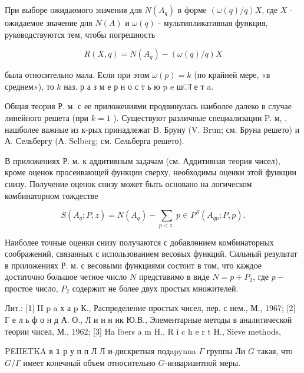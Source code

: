 \documentclass[10pt]{article}
\begin{document}
При выборе ожидаөмого значения для $N\left(A_{q}\right)$ в форме $(\omega(q) / q) X$, где $X$ - ожидаемое значение для $N(A)$ и $\omega(q)$ - мультипликативная функция, руководствуются тем, чтобы погрешность



\[

R(X, q)=N\left(A_{q}\right)-(\omega(q) / q) X

\]



была относительно мала. Если при этом $\omega(p)=k$ (по крайней мере, «в среднем»), то $k$ наз. р а з м е р н о с т ь ю p e шा е т a.



Общая теория Р. м. с ее приложениями продвинулась наиболее далеко в случае линейного решета (при $k=1$ ). Существуют различные специализации P. м, , нашболее важные из к-рых принадлежат B. Бруну (V. Brun; см. Бруна решето) и А. Сельбергу (А. Selberg; см. Сельберга решето).



В приложениях Р. м. к аддитивным задачам (см. Аддитивная теория чисел), кроме оценок просеивающей функции сверху, необходимы оценки этой функции снизу. Получение оценок снизу может быть основано на логическом комбинаторном тождестве



\[

S\left(A_{q} ; P, z\right)=N\left(A_{q}\right)-\sum_{p<z,} p \in P^{S}\left(A_{q p} ; P, p\right) .

\]



Наиболее точные оценки снизу получаются с добавлөнием комбинаторных соображений, связанных с использованием весовых функций. Сильный результат в приложениях Р. м. с весовыми функциями состоит в том, что каждое достаточно большое четное число $N$ представимо в виде $N=p+P_{2}$, где $p-$ простое число, $P_{2}$ содержит не более двух простых множителей.



Лит.: [1] II p a х а p К., Распределение простых чисел, пер. с нем., М., 1967; [2] Г е л ь ф о н д А. О., Л и н н ик Ю.В., Элементарные методы в аналитической теории чисел, М., 1962; [3] Ha lbers a m H., R i c h e r t H., Sieve methods,



PEIIETKA в $\boldsymbol{1}$ р у п п Л Л и-дискретная подapynna $\Gamma$ группы Ли $G$ такая, что $G / \Gamma$ имеет конечный объем относительно $G$-инвариантной меры.
\end{document}
